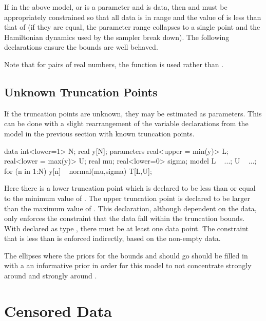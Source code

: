 If in the above model,  or  is a parameter and
 is data, then  and  must be appropriately
constrained so that all data is in range and the value of  is
less than that of  (if they are equal, the parameter range
collapses to a single point and the Hamiltonian dynamics used by 
the sampler break down).  The following declarations ensure the bounds
are well behaved.
%
\begin{stancode}
parameters {
  real<upper=min(y)> L; // L < y[n]
  real<lower=fmax(L,max(y))> U; // L < U; y[n] < U
\end{stancode}
%
Note that for pairs of real numbers, the function  is used
rather than .







\subsection{Unknown Truncation Points}

If the truncation points are unknown, they may be estimated as
parameters.  This can be done with a slight rearrangement of the
variable declarations from the model in the previous section with
known truncation points.
%
\begin{stancode}
data {
  int<lower=1> N;
  real y[N];
}
parameters {
  real<upper = min(y)> L; 
  real<lower = max(y)> U;
  real mu;
  real<lower=0> sigma;
}
model {
  L ~ ...;  
  U ~ ...;
  for (n in 1:N)
    y[n] ~ normal(mu,sigma) T[L,U];
}
\end{stancode}
%
Here there is a lower truncation point  which is declared to
be less than or equal to the minimum value of .  The upper
truncation point  is declared to be larger than the maximum
value of .  This declaration, although dependent on the data,
only enforces the constraint that the data fall within the truncation
bounds.  With  declared as type , there must be
at least one data point.  The constraint that  is less than
 is enforced indirectly, based on the non-empty data.

The ellipses where the priors for the bounds  and 
should go should be filled in with a an informative prior in
order for this model to not concentrate  strongly around 
 and  strongly around .


\section{Censored Data}

